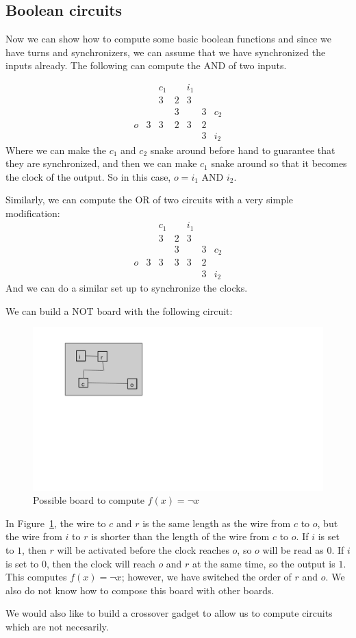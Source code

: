 \documentclass[runningheads,a4paper]{llncs}
\begin{document}
\subsection{Boolean circuits}

Now we can show how to compute some basic boolean functions and since we have turns and synchronizers, we can assume that we have synchronized the inputs already. The following can compute the AND of two inputs. 

\[ \begin{array}{cccccccc}    &    & c_1&   &  i_1 &     &  \\
					   &    & 3   & 2 &  3    &    &  \\
					   &    &    & 3 &    & 3 & c_2 \\
					o & 3 & 3 & 2 & 3 & 2 & 	    \\
					   &    &    &    &    & 3 & i_2 \end{array} \]
Where we can make the $c_1$ and $c_2$ snake around before hand to guarantee that they are synchronized, and then we can make $c_1$ snake around so that it becomes the clock of the output. So in this case, $o = i_1$ AND $i_2$.

Similarly, we can compute the OR of two circuits with a very simple modification:
\[ \begin{array}{cccccccc}    &    & c_1&   &  i_1 &     &  \\
					   &    & 3   & 2 &  3    &    &  \\
					   &    &    & 3 &    & 3 & c_2 \\
					o & 3 & 3 & 3 & 3 & 2 & 	    \\
					   &    &    &    &    & 3 & i_2 \end{array} \]
And we can do a similar set up to synchronize the clocks. 

We can build a NOT board with the following circuit:
\begin{figure}
\centering
\includegraphics[width=0.25\linewidth]{notgate.pdf}
\caption{Possible board to compute $f(x) = \neg x$}
\label{fig:NOT}
\end{figure}
In Figure~\ref{fig:NOT}, the wire to $c$ and $r$ is the same length as the wire from $c$ to $o$, but the wire from $i$ to $r$ is shorter than the length of the wire from $c$ to $o$. If $i$ is set to $1$, then $r$ will be activated before the clock reaches $o$, so $o$ will be read as 0. If $i$ is set to 0, then the clock will reach $o$ and $r$ at the same time, so the output is $1$. This computes $f(x) = \neg x$; however, we have switched the order of $r$ and $o$. We also do not know how to compose this board with other boards. 

We would also like to build a crossover gadget to allow us to compute circuits which are not necesarily.
\end{document}
